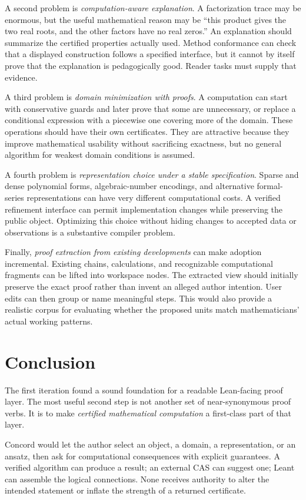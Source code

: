 \documentclass[11pt,a4paper]{article}
\newcommand{\code}[1]{\texttt{\detokenize{#1}}}
\theoremstyle{remark}
\begin{document}
A second problem is \emph{computation-aware explanation}. A factorization trace
may be enormous, but the useful mathematical reason may be ``this product gives
the two real roots, and the other factors have no real zeros.'' An explanation
should summarize the certified properties actually used. Method conformance can
check that a displayed construction follows a specified interface, but it cannot
by itself prove that the explanation is pedagogically good. Reader tasks must
supply that evidence.

A third problem is \emph{domain minimization with proofs}. A computation can start
with conservative guards and later prove that some are unnecessary, or replace a
conditional expression with a piecewise one covering more of the domain. These
operations should have their own certificates. They are attractive because they
improve mathematical usability without sacrificing exactness, but no general
algorithm for weakest domain conditions is assumed.

A fourth problem is \emph{representation choice under a stable specification}.
Sparse and dense polynomial forms, algebraic-number encodings, and alternative
formal-series representations can have very different computational costs.
A verified refinement interface can permit implementation changes while
preserving the public object. Optimizing this choice without hiding changes to
accepted data or observations is a substantive compiler problem.

Finally, \emph{proof extraction from existing developments} can make adoption
incremental. Existing \code{have} chains, calculations, and recognizable
computational fragments can be lifted into workspace nodes. The extracted view
should initially preserve the exact proof rather than invent an alleged author
intention. User edits can then group or name meaningful steps. This would also
provide a realistic corpus for evaluating whether the proposed units match
mathematicians' actual working patterns.

\section{Conclusion}
The first iteration found a sound foundation for a readable Lean-facing proof
layer. The most useful second step is not another set of near-synonymous proof
verbs. It is to make \emph{certified mathematical computation} a first-class part
of that layer.

Concord would let the author select an object, a domain, a representation, or an
ansatz, then ask for computational consequences with explicit guarantees. A
verified algorithm can produce a result; an external CAS can suggest one; Leant
can assemble the logical connections. None receives authority to alter the
intended statement or inflate the strength of a returned certificate.
\end{document}
